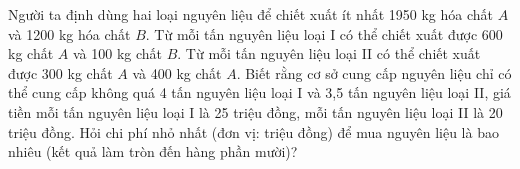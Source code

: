 \begin{ex}
 Người ta định dùng hai loại nguyên liệu để chiết xuất ít nhất 1950 kg hóa chất ${A}$ và 1200 kg hóa chất ${B}$. Từ mỗi tấn nguyên liệu loại I có thể chiết xuất được 600 kg chất ${A}$ và 100 kg chất ${B}$. Từ mỗi tấn nguyên liệu loại II có thể chiết xuất được 300 kg chất ${A}$ và 400 kg chất ${A}$. Biết rằng cơ sở cung cấp nguyên liệu chỉ có thể cung cấp không quá 4 tấn nguyên liệu loại I và 3,5 tấn nguyên liệu loại II, giá tiền mỗi tấn nguyên liệu loại I là 25 triệu đồng, mỗi tấn nguyên liệu loại II là 20 triệu đồng. Hỏi chi phí nhỏ nhất (đơn vị: triệu đồng) để mua nguyên liệu là bao nhiêu (kết quả làm tròn đến hàng phần mười)?


\end{ex}


